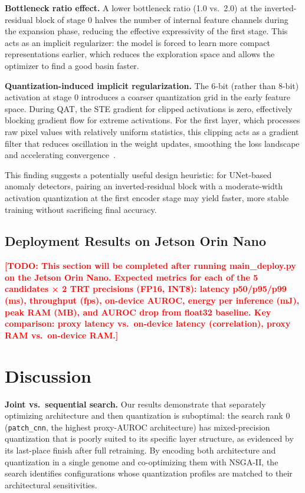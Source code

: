 \documentclass[journal]{IEEEtran}
\newcommand{\TODO}[1]{\textcolor{red}{\textbf{[TODO: #1]}}}
\begin{document}
\textbf{Bottleneck ratio effect.}
A lower bottleneck ratio (1.0 vs.\ 2.0) at the inverted-residual block of
stage 0 halves the number of internal feature channels during the expansion
phase, reducing the effective expressivity of the first stage.
This acts as an implicit regularizer: the model is forced to learn more
compact representations earlier, which reduces the exploration space and
allows the optimizer to find a good basin faster.

\textbf{Quantization-induced implicit regularization.}
The 6-bit (rather than 8-bit) activation at stage 0 introduces a coarser
quantization grid in the early feature space.
During QAT, the STE gradient for clipped activations is zero, effectively
blocking gradient flow for extreme activations.
For the first layer, which processes raw pixel values with relatively uniform
statistics, this clipping acts as a gradient filter that reduces oscillation
in the weight updates, smoothing the loss landscape and accelerating
convergence~\cite{ding2019regularizing,esser2019learned}.

This finding suggests a potentially useful design heuristic: for UNet-based
anomaly detectors, pairing an inverted-residual block with a moderate-width
activation quantization at the first encoder stage may yield faster, more
stable training without sacrificing final accuracy.

\subsection{Deployment Results on Jetson Orin Nano}
\label{sec:deploy_results}

\TODO{This section will be completed after running main\_deploy.py on the
Jetson Orin Nano. Expected metrics for each of the 5 candidates × 2 TRT
precisions (FP16, INT8): latency p50/p95/p99 (ms), throughput (fps),
on-device AUROC, energy per inference (mJ), peak RAM (MB), and AUROC drop
from float32 baseline. Key comparison: proxy latency vs.\ on-device latency
(correlation), proxy RAM vs.\ on-device RAM.}

\section{Discussion}
\label{sec:discussion}

\textbf{Joint vs.\ sequential search.}
Our results demonstrate that separately optimizing architecture and then
quantization is suboptimal: the search rank 0 (\texttt{patch\_cnn}, the highest
proxy-AUROC architecture) has mixed-precision quantization that is poorly
suited to its specific layer structure, as evidenced by its last-place finish
after full retraining.
By encoding both architecture and quantization in a single genome and
co-optimizing them with NSGA-II, the search identifies configurations whose
quantization profiles are matched to their architectural sensitivities.
\end{document}
